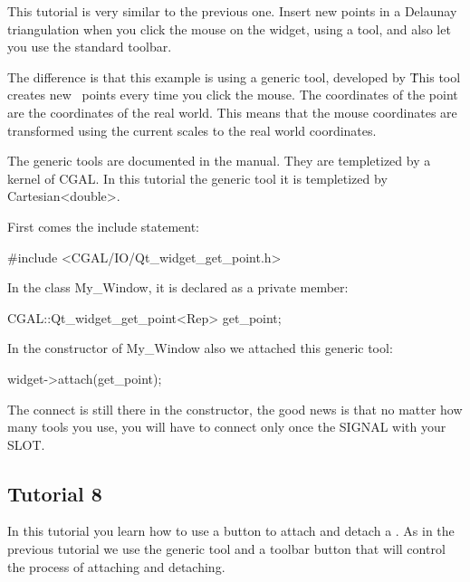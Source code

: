 This tutorial is very similar to the previous one. Insert new points
in a Delaunay triangulation when you click the mouse on the widget,
using a tool, and also let you use the standard toolbar.

The difference is that this example is using a generic tool, developed
by \cgal\. This tool creates new \cgal\ points every time you click the
mouse. The coordinates of the point are the coordinates of the real
world. This means that the mouse coordinates are transformed using the
current scales to the real world coordinates.

The generic tools are documented in the manual. They are templetized
by a kernel of CGAL. In this tutorial the generic tool
 it is templetized by Cartesian<double>.

First comes the include statement:
\begin{ccExampleCode}
#include <CGAL/IO/Qt_widget_get_point.h>
\end{ccExampleCode}
In the class My\_Window, it is declared as a private member:
\begin{ccExampleCode}
CGAL::Qt_widget_get_point<Rep> get_point;
\end{ccExampleCode}
In the constructor of My\_Window also we attached this generic tool:
\begin{ccExampleCode}
widget->attach(get_point);
\end{ccExampleCode}

The connect is still there in the constructor, the good news is that
no matter how many tools you use, you will have to connect only once
the SIGNAL with your SLOT.

\subsection*{Tutorial 8}

In this tutorial you learn how to use a button to attach and
detach a . As in the previous tutorial we use the
generic tool  and a toolbar button that will
control the process of attaching and detaching.

